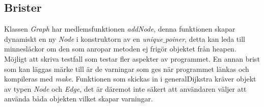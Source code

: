 \documentclass[12pt]{article}
\begin{document}
\subsection*{Brister}
Klassen \textit{Graph} har medlemsfunktionen \textit{addNode}, denna funktionen skapar dynamiskt en ny \textit{Node} i konstruktorn av en \textit{unique$\_$poiner}, detta kan leda till minnesläckor om den som anropar metoden ej frigör objektet från heapen. \\
Möjligt att skriva testfall som testar fler aspekter av programmet. En annan brist som kan läggas märke till är de varningar som ges när programmet länkas och kompileras med \textit{make}. Funktionen som skickas in i generalDijkstra kräver objekt av typen \textit{Node} och \textit{Edge}, det är däremot inte säkert att användaren väljer att använda båda objekten vilket skapar varningar.










\end{document}
